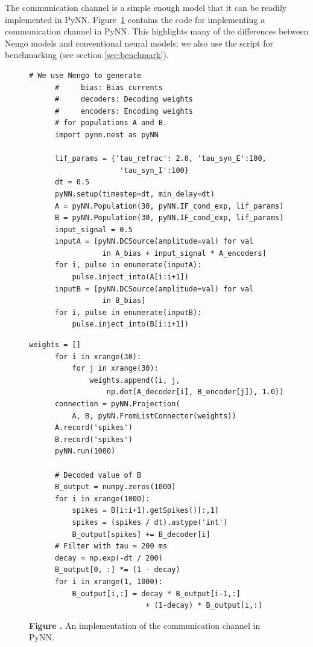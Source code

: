 \documentclass{frontiersSCNS}
\begin{document}
The communication channel
is a simple enough model
that it can be readily implemented in PyNN.
Figure~\ref{fig:pynn} contains the code
for implementing a communication channel in PyNN.
This highlights many of the differences
between Nengo models and conventional neural models;
we also use the script for benchmarking
(see section \ref{sec:benchmark}).

\begin{figure}
\begin{center}
  \begin{minipage}{.495\textwidth}
    \begin{lstlisting}[basicstyle={\footnotesize\ttfamily}]
      # We use Nengo to generate
      #     bias: Bias currents
      #     decoders: Decoding weights
      #     encoders: Encoding weights
      # for populations A and B.
      import pynn.nest as pyNN

      lif_params = {'tau_refrac': 2.0, 'tau_syn_E':100,
                     'tau_syn_I':100}
      dt = 0.5
      pyNN.setup(timestep=dt, min_delay=dt)
      A = pyNN.Population(30, pyNN.IF_cond_exp, lif_params)
      B = pyNN.Population(30, pyNN.IF_cond_exp, lif_params)
      input_signal = 0.5
      inputA = [pyNN.DCSource(amplitude=val) for val
                 in A_bias + input_signal * A_encoders]
      for i, pulse in enumerate(inputA):
          pulse.inject_into(A[i:i+1])
      inputB = [pyNN.DCSource(amplitude=val) for val
                 in B_bias]
      for i, pulse in enumerate(inputB):
          pulse.inject_into(B[i:i+1])
    \end{lstlisting}
  \end{minipage}
  \begin{minipage}{.495\textwidth}
    \begin{lstlisting}[basicstyle={\footnotesize\ttfamily}]
      weights = []
      for i in xrange(30):
          for j in xrange(30):
              weights.append((i, j,
                  np.dot(A_decoder[i], B_encoder[j]), 1.0))
      connection = pyNN.Projection(
          A, B, pyNN.FromListConnector(weights))
      A.record('spikes')
      B.record('spikes')
      pyNN.run(1000)

      # Decoded value of B
      B_output = numpy.zeros(1000)
      for i in xrange(1000):
          spikes = B[i:i+1].getSpikes()[:,1]
          spikes = (spikes / dt).astype('int')
          B_output[spikes] += B_decoder[i]
      # Filter with tau = 200 ms
      decay = np.exp(-dt / 200)
      B_output[0, :] *= (1 - decay)
      for i in xrange(1, 1000):
          B_output[i,:] = decay * B_output[i-1,:]
                           + (1-decay) * B_output[i,:]
    \end{lstlisting}
  \end{minipage}
\end{center}
 \textbf{\label{fig:pynn} Figure .}{
   An implementation of the communication channel in PyNN.}
\end{figure}
\end{document}
